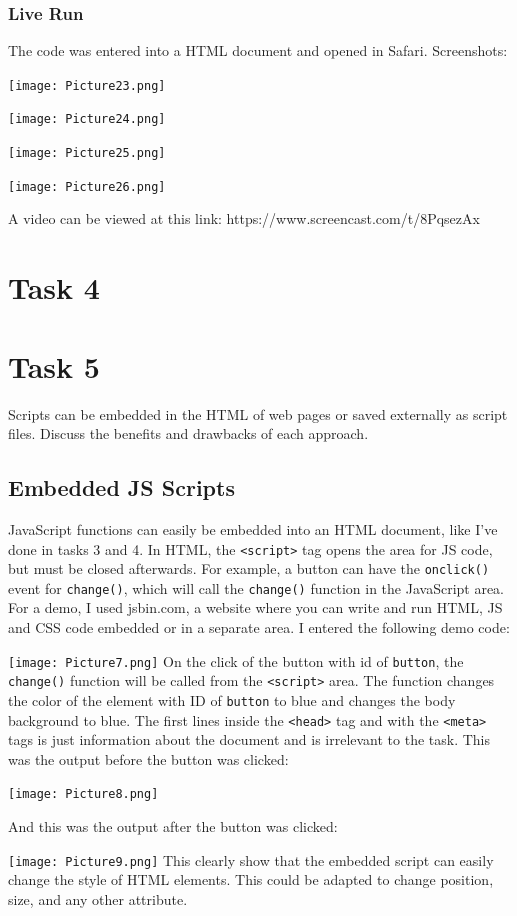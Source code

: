 \documentclass[a4paper]{article}
\begin{document}
\subsubsection{Live Run}
The code was entered into a HTML document and opened in Safari. Screenshots: \par
\noindent\texttt{[image: Picture23.png]} \par
\noindent\texttt{[image: Picture24.png]} \par
\noindent\texttt{[image: Picture25.png]} \par
\noindent\texttt{[image: Picture26.png]} \par
A video can be viewed at this link:
https://www.screencast.com/t/8PqsezAx

\newpage
\section{Task 4}

\newpage
\section{Task 5}
Scripts can be embedded in the HTML of web pages or saved externally as script files. Discuss the benefits and drawbacks of each approach.
\subsection{Embedded JS Scripts}
JavaScript functions can easily be embedded into an HTML document, like I've done in tasks 3 and 4. In HTML, the \verb|<script>| tag opens the area for JS code, but must be closed afterwards. For example, a button can have the \verb|onclick()| event for \verb|change()|, which will call the \verb|change()| function in the JavaScript area. For a demo, I used jsbin.com, a website where you can write and run HTML, JS and CSS code embedded or in a separate area. I entered the following demo code: \par
\noindent\texttt{[image: Picture7.png]}
On the click of the button with id of \verb|button|, the \verb|change()| function will be called from the \verb|<script>| area. The function changes the color of the element with ID of \verb|button| to blue and changes the body background to blue. The first lines inside the \verb|<head>| tag and with the \verb|<meta>| tags is just information about the document and is irrelevant to the task. This was the output before the button was clicked: \par
\noindent\texttt{[image: Picture8.png]}\par \newpage
And this was the output after the button was clicked: \par
\noindent\texttt{[image: Picture9.png]}
This clearly show that the embedded script can easily change the style of HTML elements. This could be adapted to change position, size, and any other attribute. \newpage
\end{document}
